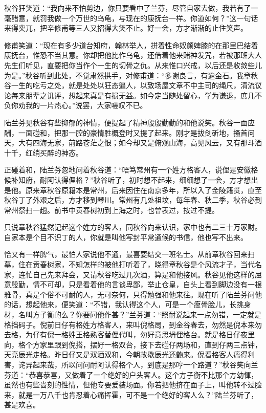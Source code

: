 \documentclass[12pt,UTF8]{ctexbook}
\begin{document}
{{{秋谷狂笑道：“我向来不怕剪边，你只要看中了兰芬，尽管自家去做，我若有了一毫醋意，就罚我做一个万世的乌龟，与现在的康抚台一样。你道如何？”这一句话来得突兀，把辛修甫等三人又招得大笑不止。好一会，方才渐渐的止住笑声。

修甫笑道：“现在有多少道台知府，翰林举人，拼着性命奴颜婢膝的在那里巴结着康抚台，惟恐不当其意。你却把他比作乌龟，还借着他来赌神发咒，若被那班大人先生们听见，直要把你当作个一生的切骨之仇。从来惟口兴戒，以后还是收敛些儿为是。”秋谷听到此处，不觉肃然拱手，对修甫道：“多谢良言，有逾金石。我章秋谷一生的吃亏之处，就是处处以狂态逼人，以致场屋文章不中主司的绳尺，清流议论每来朋辈之讥评，想起来真是有损无益。如今定当随处留心，学为谦退，庶几不负你劝我的一片热心。”说罢，大家嗟叹不已。

陆兰芬见秋谷有些抑郁的神情，便提起了精神殷殷勤勤的和他说笑。秋谷一面应酬，一面碰和，把那一腔的豪情胜概登时又提了起来。刚才是拔剑斫地，搔首问天，大有四海无家，前路苍茫之恨；如今却又是俯观山海，高见风云，又有那斗酒十千，红绡买醉的神态。

正碰着和，陆兰芬忽地问着秋谷道：“唔笃常州有一个姓方格客人，说俚是安徽格候补知府，耐阿认得俚格？”秋谷听了，初时想不起来，细细想了一会，方才想出是他。原来章秋谷原籍本是常州，后来因住在南京多年，所以入了金陵籍贯，直至秋谷丁了外艰之后，方才移到琴川。常州有几处祖坟，每年春、秋二季，秋谷必到常州祭扫一趟。前书中贡春树初到上海之时，也曾表过，按过不提。

只说章秋谷猛然记起这个姓方的客人，同秋谷向来认识，家中也有二三十万家财。自家本是个目不识丁的人，你就是叫他写封平常通候的书信，他也写不出来。

恰又有一样脾气，最怕人家说他不通，最喜要结交一班名士。从前章秋谷回来扫墓，住在贡春树家，不知怎样的被他打听着了，晓得章秋谷是个风流才子，当代名家，连忙自己先来拜会，又请秋谷吃过几次酒，算是和他接风。秋谷见他这样的屈意殷勤，情不可却，只是看着他的言谈卑鄙，举止仓皇，自头上看到脚边没有一根雅骨，真是个俗不可耐的人，无可奈何，只得勉强和他来往。现在听了陆兰芬问他的话，想起他来，便笑道：“不错，我认得这个人，可是一个瘦骨脸儿，长挑身材，名叫方子衡的么？你要问他作甚？”兰芬道：“照耐说起来一点勿错，一定就是格挡码子。倪前日仔有格姓方格客人，来叫倪格局，到金谷春去，勿然是倪本来勿去格，为仔有倪一格姓王格熟客替俚代叫，勿好意思坍俚格台。就是格日仔夜里向，格个方家里跟到倪搭，摆好一格双台，接下去碰仔两场和，直到仔两三点钟，天亮辰光走格。昨日仔又是双酒双和，今朝故歇辰光还朆来。倪看格客人瘟得利害，诧异起来哉，所以问问耐阿认得格个人，到底是那哼一个路道？”秋谷笑向兰芬道：“恭喜恭喜，又做着了一个绝好的户头客人。这个方子衡不比那个方幼惲，虽然也有些啬刻的性情，但他专要爱装场面。你若把他挤在面子上，叫他转不过脸来，就是一万八千也肯忍着心痛挥霍，可不是一个绝好的客人么？”陆兰芬听了，甚是欢喜。

}}}
\end{document}

